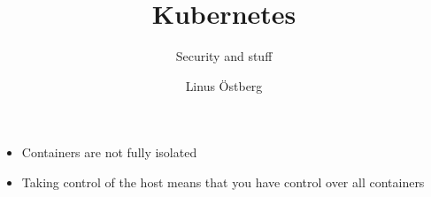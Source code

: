 \documentclass{dcpresentation}
\title{Kubernetes}
\subtitle{Security and stuff}
\author{Linus Östberg}
\institute{SciLifeLab Data Centre}
\date{}
\begin{document}
 \begin{frame}
  \maketitle
 \end{frame}
 


\begin{frame}
\end{frame}


\begin{frame}
\end{frame}



\begin{frame}
 \begin{itemize}
  \item Containers are not fully isolated
  \item Taking control of the host means that you have control over all containers
 \end{itemize}
\end{frame}
\end{document}
